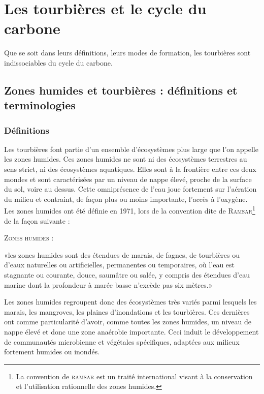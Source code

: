 \section{Les tourbières et le cycle du carbone}

Que se soit dans leurs définitions, leurs modes de formation, les tourbières sont indissociables du cycle du carbone.

\subsection{Zones humides et tourbières : définitions et terminologies}

\subsubsection{Définitions}

Les tourbières font partie d'un ensemble d'écosystèmes plus large que l'on appelle les zones humides.
Ces zones humides ne sont ni des écosystèmes terrestres au sens strict, ni des écosystèmes aquatiques.
Elles sont à la frontière entre ces deux mondes et sont caractérisées par un niveau de nappe élevé, proche de la surface du sol, voire au dessus.
Cette omniprésence de l'eau joue fortement sur l'aération du milieu et contraint, de façon plus ou moins importante, l'accès à l'oxygène.
Les zones humides ont été définie en 1971, lors de la convention dite de \textsc{Ramsar}\footnote{La convention de \textsc{ramsar} est un traité international visant à la conservation et l’utilisation rationnelle des zones humides.} de la façon suivante : 
\begin{pdef}
\textsc{Zones humides} :

«les zones humides sont des étendues de marais, de fagnes\footnotemark, de tourbières ou d'eaux naturelles ou artificielles, permanentes ou temporaires, où l'eau est stagnante ou courante, douce, saumâtre ou salée, y compris des étendues d'eau marine dont la profondeur à marée basse n'excède pas six mètres.»

\hfill {\scriptsize \citep{ramsar1987}}
\end{pdef}

Les zones humides regroupent donc des écosystèmes très variés parmi lesquels les marais, les mangroves, les plaines d'inondations et les tourbières.
Ces dernières ont comme particularité d'avoir, comme toutes les zones humides, un niveau de nappe élevé et donc une zone anaérobie importante.
Ceci induit le développement de communautés microbienne et végétales spécifiques, adaptées aux milieux fortement humides ou inondés.

